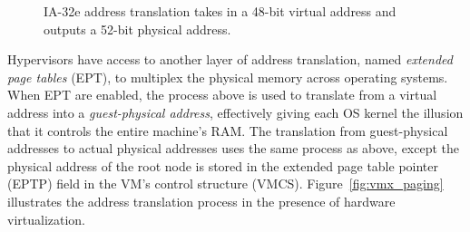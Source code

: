 \begin{figure}[hbtp]
  \caption{
    IA-32e address translation takes in a 48-bit virtual address and outputs
    a 52-bit physical address.
  }
  \label{fig:os_paging}
\end{figure}

Hypervisors have access to another layer of address translation, named
\textit{extended page tables} (EPT), to multiplex the physical memory across
operating systems. When EPT are enabled, the process above is used to translate
from a virtual address into a \textit{guest-physical address}, effectively
giving each OS kernel the illusion that it controls the entire machine's RAM.
The translation from guest-physical addresses to actual physical addresses uses
the same process as above, except the physical address of the root node is
stored in the extended page table pointer (EPTP) field in the VM's control
structure (VMCS). Figure~\ref{fig:vmx_paging} illustrates the address
translation process in the presence of hardware virtualization.

